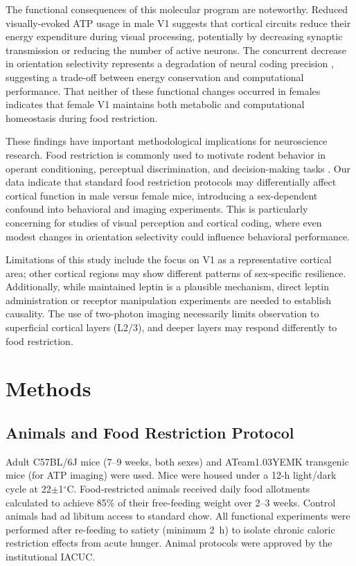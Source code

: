\documentclass[11pt]{article}
\begin{document}
The functional consequences of this molecular program are noteworthy. Reduced visually-evoked ATP usage in male V1 suggests that cortical circuits reduce their energy expenditure during visual processing, potentially by decreasing synaptic transmission or reducing the number of active neurons. The concurrent decrease in orientation selectivity represents a degradation of neural coding precision \citep{orientation_selectivity2012}, suggesting a trade-off between energy conservation and computational performance. That neither of these functional changes occurred in females indicates that female V1 maintains both metabolic and computational homeostasis during food restriction.

These findings have important methodological implications for neuroscience research. Food restriction is commonly used to motivate rodent behavior in operant conditioning, perceptual discrimination, and decision-making tasks \citep{food_restriction_behavior2015}. Our data indicate that standard food restriction protocols may differentially affect cortical function in male versus female mice, introducing a sex-dependent confound into behavioral and imaging experiments. This is particularly concerning for studies of visual perception and cortical coding, where even modest changes in orientation selectivity could influence behavioral performance.

Limitations of this study include the focus on V1 as a representative cortical area; other cortical regions may show different patterns of sex-specific resilience. Additionally, while maintained leptin is a plausible mechanism, direct leptin administration or receptor manipulation experiments are needed to establish causality. The use of two-photon imaging necessarily limits observation to superficial cortical layers (L2/3), and deeper layers may respond differently to food restriction.

\section{Methods}

\subsection{Animals and Food Restriction Protocol}

Adult C57BL/6J mice (7--9 weeks, both sexes) and ATeam1.03YEMK transgenic mice (for ATP imaging) were used. Mice were housed under a 12-h light/dark cycle at 22$\pm$1$^{\circ}$C. Food-restricted animals received daily food allotments calculated to achieve 85\% of their free-feeding weight over 2--3 weeks. Control animals had ad libitum access to standard chow. All functional experiments were performed after re-feeding to satiety (minimum 2~h) to isolate chronic caloric restriction effects from acute hunger. Animal protocols were approved by the institutional IACUC.
\end{document}
